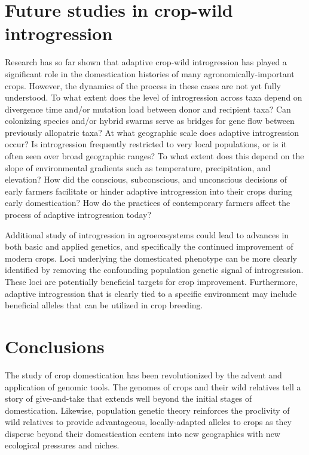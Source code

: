 \documentclass[11pt]{article}
\begin{document}
\section*{Future studies in crop-wild introgression}

Research has so far shown that adaptive crop-wild introgression has played a significant role in the domestication histories of many agronomically-important crops.
However, the dynamics of the process in these cases are not yet fully understood.
To what extent does the level of introgression across taxa depend on divergence time and/or mutation load between donor and recipient taxa?
Can colonizing species and/or hybrid swarms serve as bridges for gene flow between previously allopatric taxa?
At what geographic scale does adaptive introgression occur?
Is introgression frequently restricted to very local populations, or is it often seen over broad geographic ranges?
To what extent does this depend on the slope of environmental gradients such as temperature, precipitation, and elevation?
How did the conscious, subconscious, and unconscious decisions of early farmers facilitate or hinder adaptive introgression into their crops during early domestication?
How do the practices of contemporary farmers affect the process of adaptive introgression today?

Additional study of introgression in agroecosystems could lead to advances in both basic and applied genetics, and specifically the continued improvement of modern crops.
Loci underlying the domesticated phenotype can be more clearly identified by removing the confounding population genetic signal of introgression.
These loci are potentially beneficial targets for crop improvement.
Furthermore, adaptive introgression that is clearly tied to a specific environment may include beneficial alleles that can be utilized in crop breeding.








\section*{Conclusions}

The study of crop domestication has been revolutionized by the advent and application of genomic tools.
The genomes of crops and their wild relatives tell a story of give-and-take that extends well beyond the initial stages of domestication.
Likewise, population genetic theory reinforces the proclivity of wild relatives to provide advantageous, locally-adapted alleles to crops as they disperse beyond their domestication centers into new geographies with new ecological pressures and niches.












\end{document}
